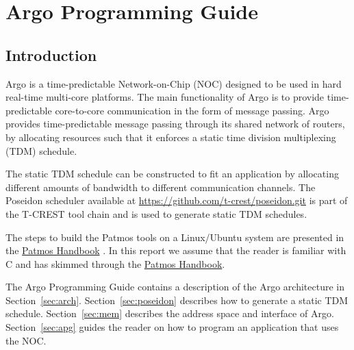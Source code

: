 \documentclass[a4paper,fontsize=10pt,twoside,DIV15,BCOR12mm,headinclude=true,footinclude=false,pagesize,bibtotoc]{scrbook}
\begin{document}
\mainmatter


\chapter{Argo Programming Guide}

\section{Introduction}

Argo is a time-predictable Network-on-Chip (NOC) designed to be used in hard real-time multi-core platforms.
The main functionality of Argo is to provide time-predictable core-to-core communication in the form of message passing.
Argo provides time-predictable message passing through its shared network of routers,
by allocating resources such that it enforces a static time division multiplexing (TDM) schedule.

The static TDM schedule can be constructed to fit an application by allocating
different amounts of bandwidth to different communication channels.
The Poseidon scheduler available at \url{https://github.com/t-crest/poseidon.git} is part of
the T-CREST tool chain and is used to generate static TDM schedules.

The steps to build the Patmos tools on a Linux/Ubuntu
system are presented in the \href{http://patmos.compute.dtu.dk/patmos_handbook.pdf}{Patmos Handbook} 
\cite{patmos-handbook}.
In this report we assume that the reader is familiar with C and has skimmed
through the \href{http://patmos.compute.dtu.dk/patmos_handbook.pdf}{Patmos Handbook}.

The Argo Programming Guide contains a description of the Argo architecture in Section~\ref{sec:arch}.
Section~\ref{sec:poseidon} describes how to generate a static TDM schedule.
Section~\ref{sec:mem} describes the address space and interface of Argo.
Section~\ref{sec:apg} guides the reader on how to program an application that uses the NOC.



\end{document}
